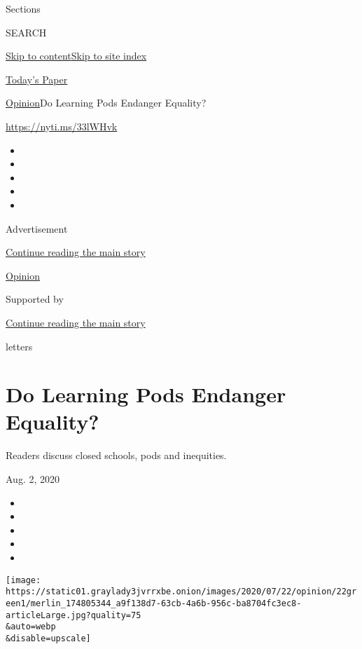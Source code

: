 Sections

SEARCH

\protect\hyperlink{site-content}{Skip to
content}\protect\hyperlink{site-index}{Skip to site index}

\href{https://myaccount.nytimes3xbfgragh.onion/auth/login?response_type=cookie\&client_id=vi}{}

\href{https://www.nytimes3xbfgragh.onion/section/todayspaper}{Today's
Paper}

\href{/section/opinion}{Opinion}\textbar{}Do Learning Pods Endanger
Equality?

\url{https://nyti.ms/33lWHvk}

\begin{itemize}
\item
\item
\item
\item
\item
\end{itemize}

Advertisement

\protect\hyperlink{after-top}{Continue reading the main story}

\href{/section/opinion}{Opinion}

Supported by

\protect\hyperlink{after-sponsor}{Continue reading the main story}

letters

\hypertarget{do-learning-pods-endanger-equality}{%
\section{Do Learning Pods Endanger
Equality?}\label{do-learning-pods-endanger-equality}}

Readers discuss closed schools, pods and inequities.

Aug. 2, 2020

\begin{itemize}
\item
\item
\item
\item
\item
\end{itemize}

\texttt{[image: https://static01.graylady3jvrrxbe.onion/images/2020/07/22/opinion/22green1/merlin\_174805344\_a9f138d7-63cb-4a6b-956c-ba8704fc3ec8-articleLarge.jpg?quality=75\\\&auto=webp\\\&disable=upscale]}

